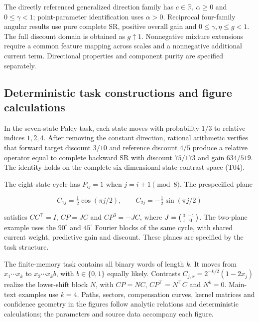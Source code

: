 \documentclass[11pt,a4paper]{article}
\begin{document}
The directly referenced generalized direction family has
\(c\in\mathbb R\), \(\alpha\geq0\) and \(0\leq\gamma<1\);
point-parameter identification uses \(\alpha>0\). Reciprocal four-family
angular results use pure complete SR, positive overall gain and
\(0\leq\gamma,\eta\leq g<1\). The full discount domain is obtained as
\(g\uparrow1\). Nonnegative mixture extensions require a common feature
mapping across scales and a nonnegative additional current term.
Directional properties and component purity are specified separately.

\subsection{Deterministic task constructions and figure
calculations}\label{deterministic-task-constructions-and-figure-calculations}

In the seven-state Paley task, each state moves with probability \(1/3\)
to relative indices \(1,2,4\). After removing the constant direction,
rational arithmetic verifies that forward target discount \(3/10\) and
reference discount \(4/5\) produce a relative operator equal to complete
backward SR with discount \(75/173\) and gain \(634/519\). The identity
holds on the complete six-dimensional state-contrast space (T04).

\par
\noindent\begin{minipage}{\linewidth}

The eight-state cycle has \(P_{ij}=1\) when \(j=i+1\pmod8\). The
prespecified plane

\[
C_{1j}=\tfrac12\cos(\pi j/2),\qquad
C_{2j}=-\tfrac12\sin(\pi j/2)
\]

\end{minipage}\par

satisfies \(CC^\top=I\), \(CP=JC\) and \(CP^3=-JC\), where
\(J=\begin{psmallmatrix}0&-1\\1&0\end{psmallmatrix}\). The two-plane
example uses the \(90^\circ\) and \(45^\circ\) Fourier blocks of the
same cycle, with shared current weight, predictive gain and discount.
These planes are specified by the task structure.

The finite-memory task contains all binary words of length \(k\). It
moves from \(x_1\cdots x_k\) to \(x_2\cdots x_kb\), with \(b\in\{0,1\}\)
equally likely. Contrasts \(C_{j,x}=2^{-k/2}(1-2x_j)\) realize the
lower-shift block \(N\), with \(CP=NC\), \(CP^\top=N^\top C\) and
\(N^k=0\). Main-text examples use \(k=4\). Paths, sectors, compensation
curves, kernel matrices and confidence geometry in the figures follow
analytic relations and deterministic calculations; the parameters and
source data accompany each figure.
\end{document}
